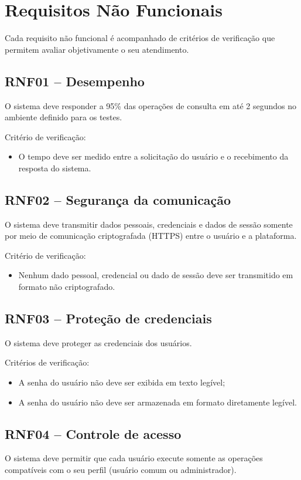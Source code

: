 \documentclass{scrreprt}
\newenvironment{fieldlist}
	{\renewcommand{\labelitemi}{--}\begin{itemize}}
	{\end{itemize}}
\begin{document}
\section{Requisitos Não Funcionais}

Cada requisito não funcional é acompanhado de critérios de verificação que
permitem avaliar objetivamente o seu atendimento.

\subsection{RNF01 -- Desempenho}
O sistema deve responder a 95\% das operações de consulta em até 2 segundos no
ambiente definido para os testes.

Critério de verificação:
\begin{fieldlist}
	\item O tempo deve ser medido entre a solicitação do usuário e o recebimento da resposta do sistema.
\end{fieldlist}

\subsection{RNF02 -- Segurança da comunicação}
O sistema deve transmitir dados pessoais, credenciais e dados de sessão somente
por meio de comunicação criptografada (HTTPS) entre o usuário e a plataforma.

Critério de verificação:
\begin{fieldlist}
	\item Nenhum dado pessoal, credencial ou dado de sessão deve ser transmitido em formato não criptografado.
\end{fieldlist}

\subsection{RNF03 -- Proteção de credenciais}
O sistema deve proteger as credenciais dos usuários.

Critérios de verificação:
\begin{fieldlist}
	\item A senha do usuário não deve ser exibida em texto legível;
	\item A senha do usuário não deve ser armazenada em formato diretamente legível.
\end{fieldlist}

\subsection{RNF04 -- Controle de acesso}
O sistema deve permitir que cada usuário execute somente as operações
compatíveis com o seu perfil (usuário comum ou administrador).
\end{document}
